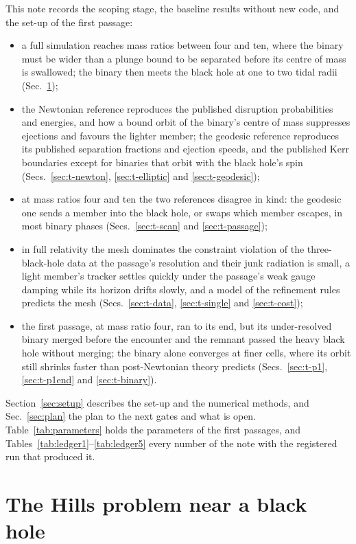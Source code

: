 \documentclass[aps,prd,twocolumn,10pt,superscriptaddress,nofootinbib,longbibliography,floatfix]{revtex4-2}
\begin{document}
This note records the scoping stage, the baseline results without new code, and the set-up of the first passage:
\begin{itemize}
\item a full simulation reaches mass ratios between four and ten, where the binary must be wider than a plunge bound to be separated before its centre of mass is swallowed; the binary then meets the black hole at one to two tidal radii (Sec.~\ref{sec:problem});
\item the Newtonian reference reproduces the published disruption probabilities and energies, and how a bound orbit of the binary's centre of mass suppresses ejections and favours the lighter member; the geodesic reference reproduces its published separation fractions and ejection speeds, and the published Kerr boundaries except for binaries that orbit with the black hole's spin (Secs.~\ref{sec:t-newton}, \ref{sec:t-elliptic} and \ref{sec:t-geodesic});
\item at mass ratios four and ten the two references disagree in kind: the geodesic one sends a member into the black hole, or swaps which member escapes, in most binary phases (Secs.~\ref{sec:t-scan} and \ref{sec:t-passage});
\item in full relativity the mesh dominates the constraint violation of the three-black-hole data at the passage's resolution and their junk radiation is small, a light member's tracker settles quickly under the passage's weak gauge damping while its horizon drifts slowly, and a model of the refinement rules predicts the mesh (Secs.~\ref{sec:t-data}, \ref{sec:t-single} and \ref{sec:t-cost});
\item the first passage, at mass ratio four, ran to its end, but its under-resolved binary merged before the encounter and the remnant passed the heavy black hole without merging; the binary alone converges at finer cells, where its orbit still shrinks faster than post-Newtonian theory predicts (Secs.~\ref{sec:t-p1}, \ref{sec:t-p1end} and \ref{sec:t-binary}).
\end{itemize}
Section~\ref{sec:setup} describes the set-up and the numerical methods, and Sec.~\ref{sec:plan} the plan to the next gates and what is open. Table~\ref{tab:parameters} holds the parameters of the first passages, and Tables~\ref{tab:ledger1}--\ref{tab:ledger5} every number of the note with the registered run that produced it.

\section{The Hills problem near a black hole}\label{sec:problem}
\end{document}
